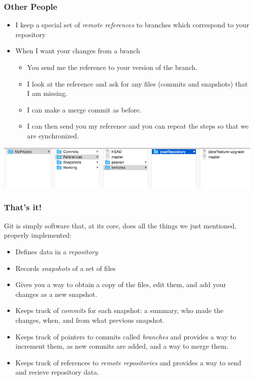 \documentclass{beamer}
\begin{document}
\begin{frame}[fragile]
\frametitle{Other People}
\begin{itemize}
\item I keep a special set of \emph{remote references} to branches which correspond to your repository
\item When I want your changes from a branch
\begin{itemize}
\item You send me the reference to your version of the branch.
\item I look at the reference and ask for any files (commits and snapshots) that I am missing.
\item I can make a merge commit as before. 
\item I can then send you my reference and you can repeat the steps so that we are synchronized.
\end{itemize}
\end{itemize}
\includegraphics[scale=0.4]{remote2.png}
\vspace{10px}
\end{frame}

\begin{frame}[fragile]
\frametitle{That's it!}
Git is simply software that, at its core, does all the things we just mentioned, properly implemented:
\begin{itemize}
\item Defines data in a \emph{repository}
\item Records \emph{snapshots} of a set of files
\item Gives you a way to obtain a copy of the files, edit them, and add your changes as a new snapshot.
\item Keeps track of \emph{commits} for each snapshot: a summary, who made the changes, when, and from what previous snapshot.
\item Keeps track of pointers to commits called \emph{branches} and provides a way to increment them, as new commits are added, and a way to merge them.
\item Keeps track of references to \emph{remote repositories} and provides a way to send and recieve repository data.
\end{itemize}
\end{frame}
\end{document}
